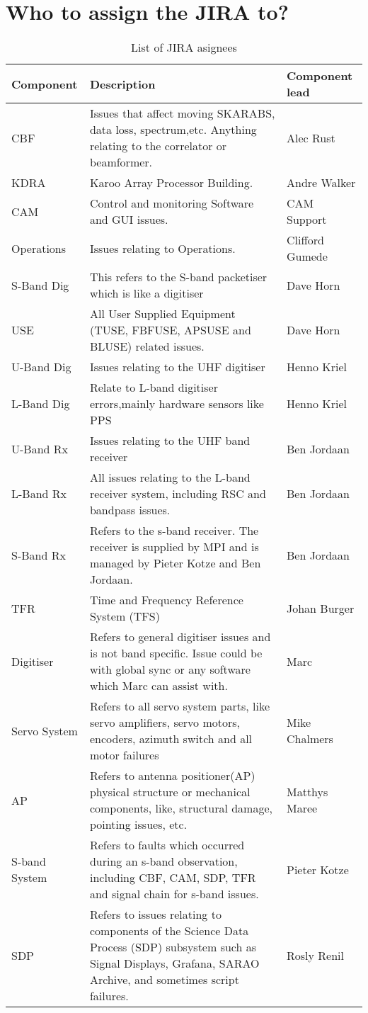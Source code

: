 \section{ Who to assign the JIRA to?}
\begin{table}[h]
	\caption{List of JIRA asignees}
	\label{tab:table1}
  \centering
	\begin{tabular}[b]{|p{4cm}|p{8cm}|p{4cm}|}
		\hline
		\textbf{Componen}t&\textbf{Description}&\textbf{Component lead}\\
		\hline
		CBF&
		Issues that affect moving SKARABS, data loss, spectrum,etc. Anything relating to the correlator or beamformer.&Alec Rust\\
		\hline
		KDRA&
		Karoo Array Processor Building.&
		Andre Walker\\
		\hline
		CAM&
		Control and monitoring Software and GUI issues.&
		CAM Support\\
		\hline
		Operations&
		Issues relating to Operations.&
		Clifford Gumede\\
		\hline
		S-Band Dig&
		This refers to the S-band packetiser which is like a digitiser&
		Dave Horn\\
		\hline
		USE&
		All User Supplied Equipment (TUSE, FBFUSE, APSUSE and BLUSE) related issues.&
		Dave Horn\\
		\hline
		U-Band Dig&
		Issues relating to the UHF digitiser&
		Henno Kriel\\
		\hline
		L-Band Dig&
		Relate to L-band digitiser errors,mainly hardware sensors like PPS&
		Henno Kriel\\
		\hline
		U-Band Rx&
		Issues relating to the UHF band receiver&
		Ben Jordaan\\
		\hline
		L-Band Rx&
		All issues relating to the L-band receiver system, including RSC and bandpass issues.&
		Ben Jordaan\\
		\hline
		S-Band Rx&
		Refers to the s-band receiver. The receiver is supplied by MPI and is managed by Pieter Kotze and Ben Jordaan.&
		Ben Jordaan\\
		\hline
		TFR&
		Time and Frequency Reference System (TFS)&
		Johan Burger\\
		\hline
		Digitiser&
		Refers to general digitiser issues and is not band specific. Issue could be with global sync or any software which Marc can assist with. &
		Marc\\
		\hline
		Servo System&
		Refers to all servo system parts, like servo amplifiers, servo motors, encoders, azimuth switch and all motor failures&
		Mike Chalmers\\
		\hline
		AP&
		Refers to antenna positioner(AP) physical structure or mechanical components, like, structural damage, pointing issues, etc.&
		Matthys Maree\\
		\hline
		S-band System&
		Refers to faults which occurred during an s-band observation, including CBF, CAM, SDP, TFR and signal chain for s-band issues.&
		Pieter Kotze\\
		\hline
		SDP&
		Refers to issues relating to  components of the Science Data Process (SDP) subsystem such as Signal Displays, Grafana, SARAO Archive, and sometimes script failures.&
		Rosly Renil\\
	

\end{tabular}
\end{table}
